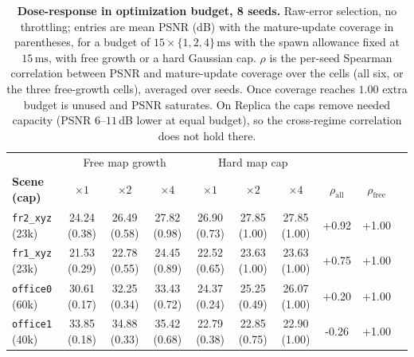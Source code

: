 \begin{table}[t]
\centering
\footnotesize\setlength{\tabcolsep}{4pt}
\begin{tabular}{lccccccccc}
\toprule
& \multicolumn{3}{c}{Free map growth} & \multicolumn{3}{c}{Hard map cap} & & \\
\textbf{Scene (cap)} & $\times1$ & $\times2$ & $\times4$ & $\times1$ & $\times2$ & $\times4$ & $\rho_{\mathrm{all}}$ & $\rho_{\mathrm{free}}$ \\
\midrule
\texttt{fr2\_xyz} (23k) & 24.24 (0.38) & 26.49 (0.58) & 27.82 (0.98) & 26.90 (0.73) & 27.85 (1.00) & 27.85 (1.00) & +0.92 & +1.00 \\
\texttt{fr1\_xyz} (23k) & 21.53 (0.29) & 22.78 (0.55) & 24.45 (0.89) & 22.52 (0.65) & 23.63 (1.00) & 23.63 (1.00) & +0.75 & +1.00 \\
\texttt{office0} (60k) & 30.61 (0.17) & 32.25 (0.34) & 33.43 (0.72) & 24.37 (0.24) & 25.25 (0.49) & 26.07 (1.00) & +0.20 & +1.00 \\
\texttt{office1} (40k) & 33.85 (0.18) & 34.88 (0.33) & 35.42 (0.68) & 22.79 (0.38) & 22.85 (0.75) & 22.90 (1.00) & -0.26 & +1.00 \\
\bottomrule
\end{tabular}
\caption{\textbf{Dose-response in optimization budget, 8 seeds.} Raw-error selection, no throttling; entries are mean PSNR (dB) with the mature-update coverage in parentheses, for a budget of $15\times\{1,2,4\}\,\mathrm{ms}$ with the spawn allowance fixed at $15\,\mathrm{ms}$, with free growth or a hard Gaussian cap. $\rho$ is the per-seed Spearman correlation between PSNR and mature-update coverage over the cells (all six, or the three free-growth cells), averaged over seeds. Once coverage reaches $1.00$ extra budget is unused and PSNR saturates. On Replica the caps remove needed capacity (PSNR $6$--$11$\,dB lower at equal budget), so the cross-regime correlation does not hold there.}
\label{tab:dose}
\end{table}
